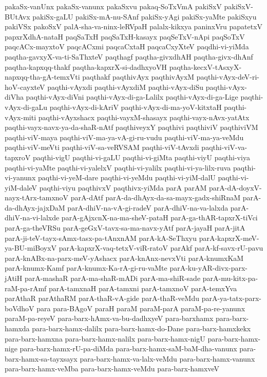 {pakaSx-vanUnx
pakaSx-vanunx
pakaSxvu
pakaq-SoTxVmA
pakiSxV
pakiSxV-BUtAvx
pakiSx-gaLU
pakiSx-mA-nu-SAnf
pakiSx-yAgi
pakiSx-yaMte
pakiSxyu
pakiVSx
pakoSxV
palA-sha-va-ninx-leRVpaH
palalx-kikxya
paninxVru
papatetxV
papxrXdhA-nataH
paqSaTxH
paqSaTxH-kasayx
paqSeTxV-nApi
paqSoTxV
paqcACx-mayxtoV
paqcACxmi
paqcaCxtaH
paqcaCxyXteV
paqdhi-vi-yiMda
paqtha-gavxyX-va-ti-SaThxteV
paqthagf
paqtha-givxdhAH
paqtha-givx-dhAnf
paqtha-kapxqq-thakf
paqtha-kapxrX-si-dadhxyoVH
paqtha-kecxV-tAsxyX-napxqq-tha-gA-temxVti
paqthakf
paqthivAyx
paqthivAyxM
paqthi-vAyx-deV-ri-hoV-cayxteV
paqthi-vAyxdi
paqthi-vAyxdiM
paqthi-vAyx-diSu
paqthi-vAyx-diVha
paqthi-vAyx-diVni
paqthi-vAyx-di-ga-Lalilx
paqthi-vAyx-di-ga-Lige
paqthi-vAyx-di-gaLu
paqthi-vAyx-di-kAriV
paqthi-vAyx-di-ma-yoV-kitxtaH
paqthi-vAyx-miti
paqthi-vAyxshacx
paqthi-vayxM-shasayx
paqthi-vayx-nAvx-yatAtx
paqthi-vayx-navx-ya-da-shaR-nAtf
paqthiveyxY
paqthivi
paqthiviV
paqthiviVM
paqthi-viV-maya
paqthi-viV-ma-ya-vA-gi-ru-vudu
paqthi-viV-ma-ya-veMdu
paqthi-viV-meVti
paqthi-viV-sa-veRVSAM
paqthi-viV-tAvxdi
paqthi-viV-va-tapxroV
paqthi-vigU
paqthi-vi-gaLU
paqthi-vi-giMta
paqthi-viyU
paqthi-viya
paqthi-vi-yaMte
paqthi-vi-yalelxV
paqthi-vi-yalilx
paqthi-vi-ya-lilx-ruva
paqthi-vi-yanunx
paqthi-vi-yeM-dare
paqthi-vi-yeMdu
paqthi-vi-yiM-dalU
paqthi-vi-yiM-daleV
paqthi-viyu
paqthivxV
paqthivx-yiMda
parA
parAM
parA-dA-doyxV-nayx-tArx-tamxnoV
parA-dAtf
parA-da-dhAyx-da-sa-mayx-gadx-shiRnaM
parA-da-dhAyx-jajxDaM
parA-dhiV-na-vA-gi-radeV
parA-dhiV-na-va-lalxda
parA-dhiV-na-vi-lalxde
parA-gAjxcnX-na-ma-sheV-pataH
parA-ga-thAR-tapxrX-tiVci
parA-ga-theVRSu
parA-geGxV-tavx-sa-ma-navx-yAtf
parA-jayaH
parA-jitA
parA-ji-teV-tayx-sAmx-tasx-pa-tAnxnAM
parA-kA-SeThxyu
parA-kapxrX-meV-ya-BU-miBoyxV
parA-kapxrX-vaq-tetxV-viR-ratoV
parAkf
parA-kf-savx-rU-pavu
parA-knABx-na-parx-meV-yAshacx
parA-knAnx-nevxVti
parA-knumxKaM
parA-knumx-Kamf
parA-knumx-Ka-rA-gi-ru-vaMte
parA-ku-yAR-divx-parx-jAtiH
parA-mashaR
parA-ma-shaR-mADi
parA-ma-shiR-sade
parA-mu-kitx-pa-raM-pa-rAmf
parA-tamxnaH
parA-tamxni
parA-tamxnoV
parA-temxYva
parAthaR
parAthaRM
parA-thaR-vA-gide
parA-thaR-veMdu
parA-ya-tatx-parx-boVdhoV
para
para-BAgoV
paraH
paraM
paraM-parA
paraM-pa-re-yanunx
paraM-pa-reyeV
para-barx-hAmx-va-bu-dadhxyeV
para-barxhamx
para-barx-hamxda
para-barx-hamx-dalilx
para-barx-hamx-do-Dane
para-barx-hamxkekx
para-barx-hamxna
para-barx-hamx-nalilx
para-barx-hamx-nigU
para-barx-hamx-nige
para-barx-hamx-rU-pa-diMda
para-barx-hamx-saM-baM-dha-vanunx
para-barx-hamx-sa-tayxsayx
para-barx-hamx-va-lalx-veMdu
para-barx-hamx-vanunx
para-barx-hamx-veMba
para-barx-hamx-veMdu
para-barx-hamxveV
}
